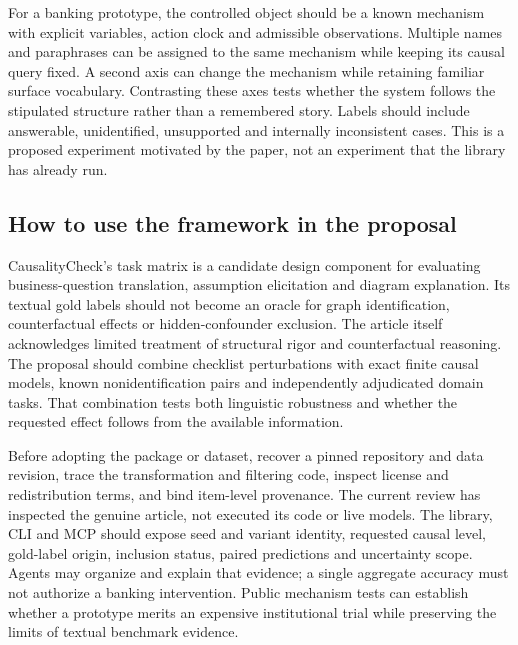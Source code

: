 For a banking prototype, the controlled object should be a known mechanism with explicit variables, action clock and admissible observations. Multiple names and paraphrases can be assigned to the same mechanism while keeping its causal query fixed. A second axis can change the mechanism while retaining familiar surface vocabulary. Contrasting these axes tests whether the system follows the stipulated structure rather than a remembered story. Labels should include answerable, unidentified, unsupported and internally inconsistent cases. This is a proposed experiment motivated by the paper, not an experiment that the library has already run.

\subsection{How to use the framework in the proposal}
\label{exec21:check-integration}
CausalityCheck's task matrix is a candidate design component for evaluating business-question translation, assumption elicitation and diagram explanation. Its textual gold labels should not become an oracle for graph identification, counterfactual effects or hidden-confounder exclusion. The article itself acknowledges limited treatment of structural rigor and counterfactual reasoning. The proposal should combine checklist perturbations with exact finite causal models, known nonidentification pairs and independently adjudicated domain tasks. That combination tests both linguistic robustness and whether the requested effect follows from the available information.\citep{exec21_causalitycheck}

Before adopting the package or dataset, recover a pinned repository and data revision, trace the transformation and filtering code, inspect license and redistribution terms, and bind item-level provenance. The current review has inspected the genuine article, not executed its code or live models. The library, CLI and MCP should expose seed and variant identity, requested causal level, gold-label origin, inclusion status, paired predictions and uncertainty scope. Agents may organize and explain that evidence; a single aggregate accuracy must not authorize a banking intervention. Public mechanism tests can establish whether a prototype merits an expensive institutional trial while preserving the limits of textual benchmark evidence.
